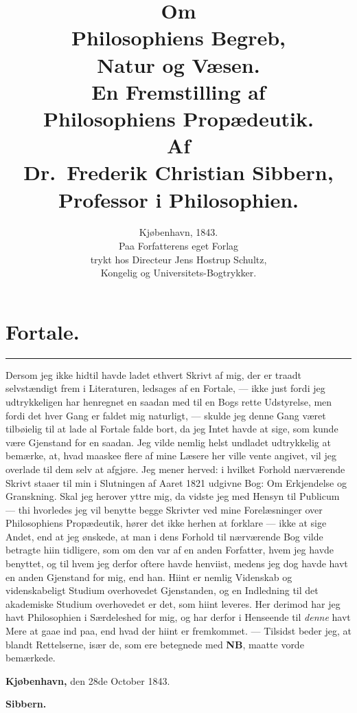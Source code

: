 \documentclass[12pt,a4paper]{book}
\title{\textbf{Om}\\[6pt]
  \Huge\textbf{Philosophiens Begreb,}\\[6pt]
  \LARGE\textbf{Natur og Væsen.}\\[14pt]
  \normalsize En Fremstilling af\\[4pt]
  \Large\textbf{Philosophiens Propædeutik.}\\[16pt]
  \normalsize Af\\[6pt]
  \large Dr.\ Frederik Christian Sibbern,\\[4pt]
  \normalsize Professor i Philosophien.}
\author{}
\date{Kjøbenhavn, 1843.\\
  Paa Forfatterens eget Forlag\\
  trykt hos Directeur Jens Hostrup Schultz,\\
  Kongelig og Universitets-Bogtrykker.}
\begin{document}
\maketitle
\thispagestyle{empty}
\cleardoublepage

\chapter*{Fortale.}

\begin{center}\rule{0.28\linewidth}{0.4pt}\end{center}

Dersom jeg ikke hidtil havde ladet ethvert Skrivt af mig, der er traadt
selvstændigt frem i Literaturen, ledsages af en Fortale, --- ikke just fordi
jeg udtrykkeligen har henregnet en saadan med til en Bogs rette Udstyrelse,
men fordi det hver Gang er faldet mig naturligt, --- skulde jeg denne Gang
været tilbøielig til at lade al Fortale falde bort, da jeg Intet havde at
sige, som kunde være Gjenstand for en saadan. Jeg vilde nemlig helst undladet
udtrykkelig at bemærke, at, hvad maaskee flere af mine Læsere her ville vente
angivet, vil jeg overlade til dem selv at afgjøre. Jeg mener herved: i hvilket
Forhold nærværende Skrivt staaer til min i Slutningen af Aaret 1821 udgivne
Bog: Om Erkjendelse og Granskning. Skal jeg herover yttre mig, da vidste jeg
med Hensyn til Publicum --- thi hvorledes jeg vil benytte begge Skrivter ved
mine Forelæsninger over Philosophiens Propædeutik, hører det ikke herhen at
forklare --- ikke at sige Andet, end at jeg ønskede, at man i dens Forhold til
nærværende Bog vilde betragte hiin tidligere, som om den var af en anden
Forfatter, hvem jeg havde benyttet, og til hvem jeg derfor oftere havde
henviist, medens jeg dog havde havt en anden Gjenstand for mig, end han. Hiint
er nemlig Videnskab og videnskabeligt Studium overhovedet Gjenstanden, og en
Indledning til det akademiske Studium overhovedet er det, som hiint leveres.
Her derimod har jeg havt Philosophien i Særdeleshed for mig, og har derfor i
Henseende til \emph{denne} havt Mere at gaae ind paa, end hvad der hiint er
fremkommet. --- Tilsidst beder jeg, at blandt Rettelserne, især de, som ere
betegnede med \textbf{NB}, maatte vorde bemærkede.

\bigskip
\noindent\textbf{Kjøbenhavn,} den 28de October 1843.
\nopagebreak
\begin{flushright}\textbf{Sibbern.}\end{flushright}
\end{document}
